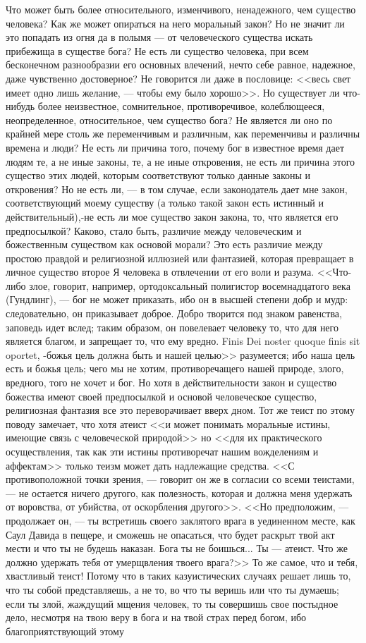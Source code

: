 \documentclass[12pt]{article}
\begin{document}
Что может быть более относительного, изменчивого, ненадежного, чем существо человека? Как же может опираться на него моральный закон? Но не значит ли это попадать из огня да в полымя --- от человеческого существа искать прибежища в существе бога? Не есть ли существо человека, при всем бесконечном разнообразии его основных влечений, нечто себе равное, надежное, даже чувственно достоверное? Не говорится ли даже в пословице: <<весь свет имеет одно лишь желание, --- чтобы ему было хорошо>>. Но существует ли что-нибудь более неизвестное, сомнительное, противоречивое, колеблющееся, неопределенное, относительное, чем существо бога? Не является ли оно по крайней мере столь же переменчивым и различным, как переменчивы и различны времена и люди? Не есть ли причина того, почему бог в известное время дает людям те, а не иные законы, те, а не иные откровения, не есть ли причина этого существо этих людей, которым соответствуют только данные законы и откровения? Но не есть ли, --- в том случае, если законодатель дает мне закон, соответствующий моему существу (а только такой закон есть истинный и действительный),-не есть ли мое существо закон закона, то, что является его предпосылкой? Каково, стало быть, различие между человеческим и божественным существом как основой морали? Это есть различие между простою правдой и религиозной иллюзией или фантазией, которая превращает в личное существо второе Я человека в отвлечении от его воли и разума. <<Что-либо злое, говорит, например, ортодоксальный полигистор восемнадцатого века (Гундлинг), --- бог не может приказать, ибо он в высшей степени добр и мудр: следовательно, он приказывает доброе. Добро творится под знаком равенства, заповедь идет вслед; таким образом, он повелевает человеку то, что для него является благом, и запрещает то, что ему вредно. Finis Dei noster quoque finis sit oportet, -божья цель должна быть и нашей целью>>  разумеется; ибо наша цель есть и божья цель; чего мы не хотим, противоречащего нашей природе, злого, вредного, того не хочет и бог. Но хотя в действительности закон и существо божества имеют своей предпосылкой и основой человеческое существо, религиозная фантазия все это переворачивает вверх дном. Тот же теист по этому поводу замечает, что хотя атеист <<и может понимать моральные истины, имеющие связь с человеческой природой>>  но <<для их практического осуществления, так как эти истины противоречат нашим вожделениям и аффектам>>  только теизм может дать надлежащие средства. <<С противоположной точки зрения, --- говорит он же в согласии со всеми теистами, --- не остается ничего другого, как полезность, которая и должна меня удержать от воровства, от убийства, от оскорбления другого>>. <<Но предположим, --- продолжает он, --- ты встретишь своего заклятого врага в уединенном месте, как Саул Давида в пещере, и сможешь не опасаться, что будет раскрыт твой акт мести и что ты не будешь наказан. Бога ты не боишься... Ты --- атеист. Что же должно удержать тебя от умерщвления твоего врага?>> То же самое, что и тебя, хвастливый теист! Потому что в таких казуистических случаях решает лишь то, что ты собой представляешь, а не то, во что ты веришь или что ты думаешь; если ты злой, жаждущий мщения человек, то ты совершишь свое постыдное дело, несмотря на твою веру в бога и на твой страх перед богом, ибо благоприятствующий этому 
\end{document}
